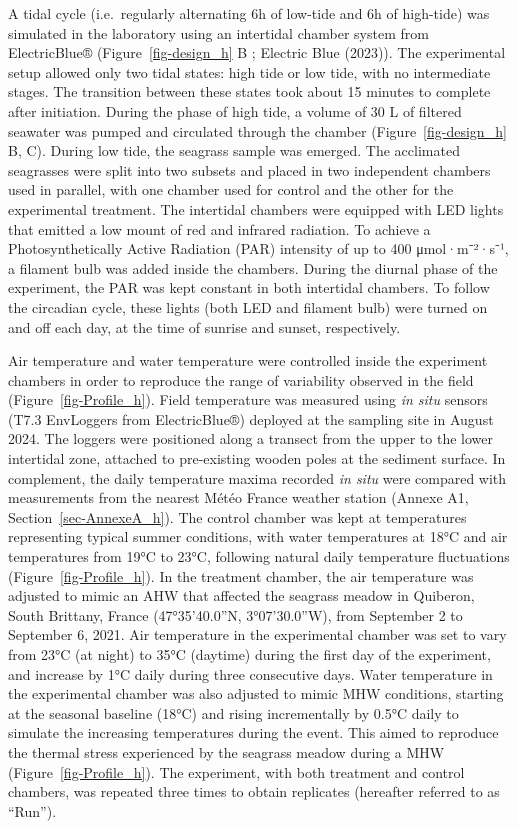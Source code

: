 \documentclass[
  letterpaper,
  11pt,
  english,
  singlespacing,
  headsepline]{MastersDoctoralThesis}
\begin{document}
\begin{spacing}{1.5}
A tidal cycle (i.e.~regularly alternating 6h of low-tide and 6h of
high-tide) was simulated in the laboratory using an intertidal chamber
system from ElectricBlue® (Figure~\ref{fig-design_h} B ; Electric Blue
(2023)). The experimental setup allowed only two tidal states: high tide
or low tide, with no intermediate stages. The transition between these
states took about 15 minutes to complete after initiation. During the
phase of high tide, a volume of 30 L of filtered seawater was pumped and
circulated through the chamber (Figure~\ref{fig-design_h} B, C). During
low tide, the seagrass sample was emerged. The acclimated seagrasses
were split into two subsets and placed in two independent chambers used
in parallel, with one chamber used for control and the other for the
experimental treatment. The intertidal chambers were equipped with LED
lights that emitted a low mount of red and infrared radiation. To
achieve a Photosynthetically Active Radiation (PAR) intensity of up to
400 μmol·m⁻²·s⁻¹, a filament bulb was added inside the chambers. During
the diurnal phase of the experiment, the PAR was kept constant in both
intertidal chambers. To follow the circadian cycle, these lights (both
LED and filament bulb) were turned on and off each day, at the time of
sunrise and sunset, respectively.

Air temperature and water temperature were controlled inside the
experiment chambers in order to reproduce the range of variability
observed in the field (Figure~\ref{fig-Profile_h}). Field temperature
was measured using \emph{in situ} sensors (T7.3 EnvLoggers from
ElectricBlue®) deployed at the sampling site in August 2024. The loggers
were positioned along a transect from the upper to the lower intertidal
zone, attached to pre-existing wooden poles at the sediment surface. In
complement, the daily temperature maxima recorded \emph{in situ} were
compared with measurements from the nearest Météo France weather station
(Annexe A1, Section~\ref{sec-AnnexeA_h}). The control chamber was kept
at temperatures representing typical summer conditions, with water
temperatures at 18°C and air temperatures from 19°C to 23°C, following
natural daily temperature fluctuations (Figure~\ref{fig-Profile_h}). In
the treatment chamber, the air temperature was adjusted to mimic an AHW
that affected the seagrass meadow in Quiberon, South Brittany, France
(47°35'40.0''N, 3°07'30.0''W), from September 2 to September 6, 2021.
Air temperature in the experimental chamber was set to vary from 23°C
(at night) to 35°C (daytime) during the first day of the experiment, and
increase by 1°C daily during three consecutive days. Water temperature
in the experimental chamber was also adjusted to mimic MHW conditions,
starting at the seasonal baseline (18°C) and rising incrementally by
0.5°C daily to simulate the increasing temperatures during the event.
This aimed to reproduce the thermal stress experienced by the seagrass
meadow during a MHW (Figure~\ref{fig-Profile_h}). The experiment, with
both treatment and control chambers, was repeated three times to obtain
replicates (hereafter referred to as ``Run'').


\end{spacing}
\end{document}
